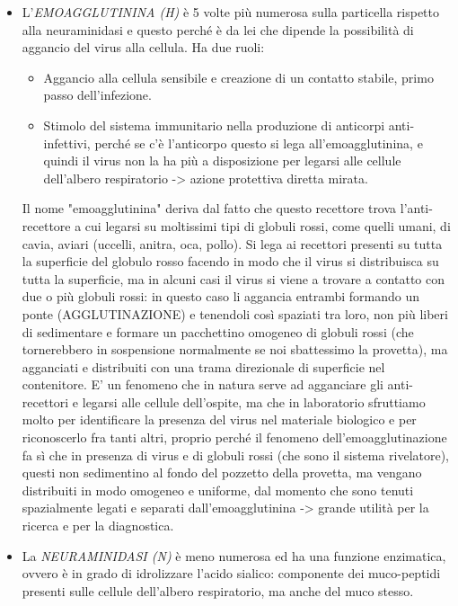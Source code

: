 \begin{itemize}
\item
 L'\emph{EMOAGGLUTININA (H)} è 5 volte più numerosa sulla particella
  rispetto alla neuraminidasi e questo perché è da lei che dipende la
  possibilità di aggancio del virus alla cellula. Ha due ruoli:
  \begin{itemize}
  
\item
  Aggancio alla cellula sensibile e creazione di un contatto stabile,
  primo passo dell'infezione.
\item
  Stimolo del sistema immunitario nella produzione di anticorpi
  anti-infettivi, perché se c'è l'anticorpo questo si lega
  all'emoagglutinina, e quindi il virus non la ha più a disposizione per
  legarsi alle cellule dell'albero respiratorio -> azione protettiva
  diretta mirata.
\end{itemize}
  Il nome "emoagglutinina" deriva dal fatto che questo recettore trova
  l'anti-recettore a cui legarsi su moltissimi tipi di globuli rossi,
  come quelli umani, di cavia, aviari (uccelli, anitra, oca, pollo). Si
  lega ai recettori presenti su tutta la superficie del globulo rosso
  facendo in modo che il virus si distribuisca su tutta la superficie,
  ma in alcuni casi il virus si viene a trovare a contatto con due o più
  globuli rossi: in questo caso li aggancia entrambi formando un ponte
  (AGGLUTINAZIONE) e tenendoli così spaziati tra loro, non più liberi di
  sedimentare e formare un pacchettino omogeneo di globuli rossi (che
  tornerebbero in sospensione normalmente se noi sbattessimo la
  provetta), ma agganciati e distribuiti con una trama direzionale di
  superficie nel contenitore. E' un fenomeno che in natura serve ad
  agganciare gli anti-recettori e legarsi alle cellule dell'ospite, ma
  che in laboratorio sfruttiamo molto per identificare la presenza del
  virus nel materiale biologico e per riconoscerlo fra tanti altri,
  proprio perché il fenomeno dell'emoagglutinazione fa sì che in
  presenza di virus e di globuli rossi (che sono il sistema rivelatore),
  questi non sedimentino al fondo del pozzetto della provetta, ma
  vengano distribuiti in modo omogeneo e uniforme, dal momento che sono
  tenuti spazialmente legati e separati dall'emoagglutinina -> grande
  utilità per la ricerca e per la diagnostica.

\item La \emph{NEURAMINIDASI (N)} è meno numerosa ed ha una funzione
  enzimatica, ovvero è in grado di idrolizzare l'acido sialico:
  componente dei muco-peptidi presenti sulle cellule dell'albero
  respiratorio, ma anche del muco stesso.


\end{itemize}

